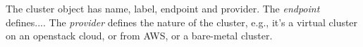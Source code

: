 The cluster object has name, label, endpoint and provider. The \textit{endpoint}
defines.... The \textit{provider} defines the nature of the cluster,
e.g., it's a virtual cluster on an openstack cloud, or from AWS, or a bare-metal
cluster.
